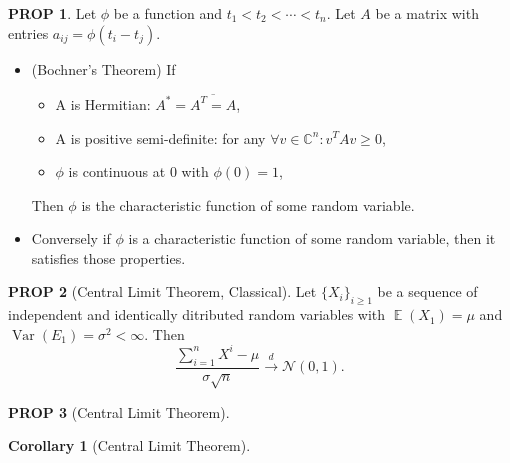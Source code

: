 \documentclass[hidelinks,11pt]{article}
\theoremstyle{definition}
\theoremstyle{dotles}
\theoremstyle{dotless}
\newtheorem{prop}{PROP}[section]
\newtheorem*{corollary}{Corollary}
\theoremstyle{remark}
\DeclareMathOperator{\Var}{Var}
\DeclareMathOperator{\E}{\mathbb{E}}
\begin{document}
\begin{prop}
Let $\phi$ be a function and $t_1<t_2<\cdots<t_n$. Let $A$ be a matrix with entries $a_{ij}=\phi(t_i-t_j)$.\begin{itemize}
    \item \textup{(Bochner's Theorem)} If\begin{itemize}
        \item A is Hermitian: $A^*=\overline{A^T=A}$,
        \item A is positive semi-definite: for any $\forall v\in\mathbb{C}^n:v^TAv\geq0$,
        \item $\phi$ is continuous at 0 with $\phi(0)=1$,
    \end{itemize}
    Then $\phi$ is the characteristic function of some random variable.
    \item Conversely if $\phi$ is a characteristic function of some random variable, then it satisfies those properties.
\end{itemize}
\end{prop}

\begin{prop}[Central Limit Theorem, Classical]
Let $\{X_i\}_{i\geq1}$ be a sequence of independent and identically ditributed random variables with $\E(X_1)=\mu$ and $\Var(E_1)=\sigma^2<\infty$. Then
\[\frac{\sum_{i=1}^nX^i-\mu}{\sigma\sqrt{n}}\xrightarrow{d}\mathcal{N}(0,1).\]
\end{prop}

\begin{prop}[Central Limit Theorem]

\end{prop}

\begin{corollary}[Central Limit Theorem]

\end{corollary}
\end{document}
